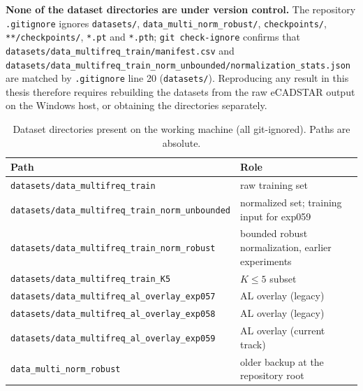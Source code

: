 \textbf{None of the dataset directories are under version control.} The repository
\texttt{.gitignore} ignores \texttt{datasets/}, \texttt{data\_multi\_norm\_robust/},
\texttt{checkpoints/}, \texttt{**/checkpoints/}, \texttt{*.pt} and \texttt{*.pth};
\texttt{git check-ignore} confirms that
\texttt{datasets/\allowbreak{}data\_\allowbreak{}multifreq\_\allowbreak{}train/\allowbreak{}manifest.csv} and
\texttt{datasets/\allowbreak{}data\_\allowbreak{}multifreq\_\allowbreak{}train\_\allowbreak{}norm\_\allowbreak{}unbounded/\allowbreak{}normalization\_\allowbreak{}stats.json} are matched by
\texttt{.gitignore} line 20 (\texttt{datasets/}). Reproducing any result in this thesis therefore
requires rebuilding the datasets from the raw eCADSTAR output on the Windows host, or obtaining the
directories separately.

\begin{table}[htbp]
\centering
\caption{Dataset directories present on the working machine (all git-ignored). Paths are absolute.}
\label{tab:appA_inventory}
\begin{tabular}{p{} p{}}
\hline
Path & Role \\
\hline
\texttt{datasets/data\_multifreq\_train} & raw training set \\
\texttt{datasets/\allowbreak{}data\_\allowbreak{}multifreq\_\allowbreak{}train\_\allowbreak{}norm\_\allowbreak{}unbounded} & normalized set;
training input for exp059 \\
\texttt{datasets/\allowbreak{}data\_\allowbreak{}multifreq\_\allowbreak{}train\_\allowbreak{}norm\_\allowbreak{}robust} & bounded robust
normalization, earlier experiments \\
\texttt{datasets/\allowbreak{}data\_\allowbreak{}multifreq\_\allowbreak{}train\_\allowbreak{}K5} & $K\le5$ subset \\
\texttt{datasets/\allowbreak{}data\_\allowbreak{}multifreq\_\allowbreak{}al\_\allowbreak{}overlay\_\allowbreak{}exp057} & AL overlay
(legacy) \\
\texttt{datasets/\allowbreak{}data\_\allowbreak{}multifreq\_\allowbreak{}al\_\allowbreak{}overlay\_\allowbreak{}exp058} & AL overlay
(legacy) \\
\texttt{datasets/\allowbreak{}data\_\allowbreak{}multifreq\_\allowbreak{}al\_\allowbreak{}overlay\_\allowbreak{}exp059} & AL overlay
(current track) \\
\texttt{data\_multi\_norm\_robust} & older backup at the repository root \\
\hline
\end{tabular}
\end{table}

